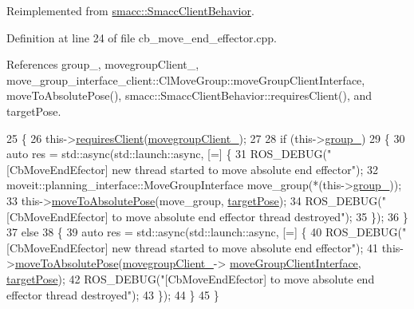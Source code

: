 Reimplemented from \hyperlink{classsmacc_1_1SmaccClientBehavior_a7962382f93987c720ad432fef55b123f}{smacc\+::\+Smacc\+Client\+Behavior}.



Definition at line 24 of file cb\+\_\+move\+\_\+end\+\_\+effector.\+cpp.



References group\+\_\+, movegroup\+Client\+\_\+, move\+\_\+group\+\_\+interface\+\_\+client\+::\+Cl\+Move\+Group\+::move\+Group\+Client\+Interface, move\+To\+Absolute\+Pose(), smacc\+::\+Smacc\+Client\+Behavior\+::requires\+Client(), and target\+Pose.


\begin{DoxyCode}
25 \{
26   this->\hyperlink{classsmacc_1_1SmaccClientBehavior_a917f001e763a1059af337bf4e164f542}{requiresClient}(\hyperlink{classmove__group__interface__client_1_1CbMoveEndEffector_aec44abef326949b57872d68e7b495194}{movegroupClient\_});
27 
28   \textcolor{keywordflow}{if} (this->\hyperlink{classmove__group__interface__client_1_1CbMoveEndEffector_a91cf66e5db59f176ae7c811cc0ebfb91}{group\_})
29   \{
30     \textcolor{keyword}{auto} res = std::async(std::launch::async, [=] \{
31       ROS\_DEBUG(\textcolor{stringliteral}{"[CbMoveEndEfector] new thread started to move absolute end effector"});
32       moveit::planning\_interface::MoveGroupInterface move\_group(*(this->\hyperlink{classmove__group__interface__client_1_1CbMoveEndEffector_a91cf66e5db59f176ae7c811cc0ebfb91}{group\_}));
33       this->\hyperlink{classmove__group__interface__client_1_1CbMoveEndEffector_a7850f5f9c6fbc040b77e8456a2ecee09}{moveToAbsolutePose}(move\_group, \hyperlink{classmove__group__interface__client_1_1CbMoveEndEffector_a645e7131ef58ab052efbadf53ea82c59}{targetPose});
34       ROS\_DEBUG(\textcolor{stringliteral}{"[CbMoveEndEfector] to move absolute end effector thread destroyed"});
35     \});
36   \}
37   \textcolor{keywordflow}{else}
38   \{
39     \textcolor{keyword}{auto} res = std::async(std::launch::async, [=] \{
40       ROS\_DEBUG(\textcolor{stringliteral}{"[CbMoveEndEfector] new thread started to move absolute end effector"});
41       this->\hyperlink{classmove__group__interface__client_1_1CbMoveEndEffector_a7850f5f9c6fbc040b77e8456a2ecee09}{moveToAbsolutePose}(\hyperlink{classmove__group__interface__client_1_1CbMoveEndEffector_aec44abef326949b57872d68e7b495194}{movegroupClient\_}->
      \hyperlink{classmove__group__interface__client_1_1ClMoveGroup_a5f0ea9b52695661b17605691168d1f31}{moveGroupClientInterface}, \hyperlink{classmove__group__interface__client_1_1CbMoveEndEffector_a645e7131ef58ab052efbadf53ea82c59}{targetPose});
42       ROS\_DEBUG(\textcolor{stringliteral}{"[CbMoveEndEfector] to move absolute end effector thread destroyed"});
43     \});
44   \}
45 \}
\end{DoxyCode}
